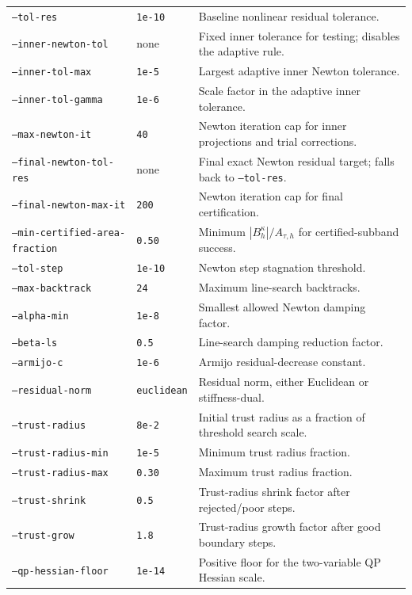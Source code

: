 \documentclass[11pt]{article}
\begin{document}
\begin{longtable}{>{\raggedright\arraybackslash}p{}
                  >{\raggedright\arraybackslash}p{}
                  >{\raggedright\arraybackslash}p{}}
\texttt{--tol-res} & \texttt{1e-10} & Baseline nonlinear residual tolerance. \\
\texttt{--inner-newton-tol} & none & Fixed inner tolerance for testing; disables the adaptive rule. \\
\texttt{--inner-tol-max} & \texttt{1e-5} & Largest adaptive inner Newton tolerance. \\
\texttt{--inner-tol-gamma} & \texttt{1e-6} & Scale factor in the adaptive inner tolerance. \\
\texttt{--max-newton-it} & \texttt{40} & Newton iteration cap for inner projections and trial corrections. \\
\texttt{--final-newton-tol-res} & none & Final exact Newton residual target; falls back to \texttt{--tol-res}. \\
\texttt{--final-newton-max-it} & \texttt{200} & Newton iteration cap for final certification. \\
\texttt{--min-certified-area-fraction} & \texttt{0.50} & Minimum $|B_h^\kappa|/A_{\tau,h}$ for certified-subband success. \\
\texttt{--tol-step} & \texttt{1e-10} & Newton step stagnation threshold. \\
\texttt{--max-backtrack} & \texttt{24} & Maximum line-search backtracks. \\
\texttt{--alpha-min} & \texttt{1e-8} & Smallest allowed Newton damping factor. \\
\texttt{--beta-ls} & \texttt{0.5} & Line-search damping reduction factor. \\
\texttt{--armijo-c} & \texttt{1e-6} & Armijo residual-decrease constant. \\
\texttt{--residual-norm} & \texttt{euclidean} & Residual norm, either Euclidean or stiffness-dual. \\
\texttt{--trust-radius} & \texttt{8e-2} & Initial trust radius as a fraction of threshold search scale. \\
\texttt{--trust-radius-min} & \texttt{1e-5} & Minimum trust radius fraction. \\
\texttt{--trust-radius-max} & \texttt{0.30} & Maximum trust radius fraction. \\
\texttt{--trust-shrink} & \texttt{0.5} & Trust-radius shrink factor after rejected/poor steps. \\
\texttt{--trust-grow} & \texttt{1.8} & Trust-radius growth factor after good boundary steps. \\
\texttt{--qp-hessian-floor} & \texttt{1e-14} & Positive floor for the two-variable QP Hessian scale. \\

\end{longtable}
\end{document}
